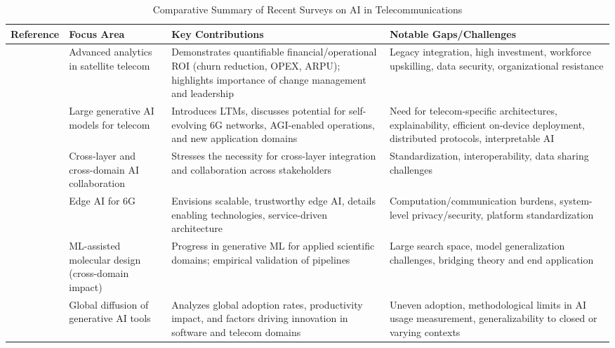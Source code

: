 \documentclass[sigconf]{acmart}
\begin{document}
\begin{table*}[htbp]
\centering
\caption{Comparative Summary of Recent Surveys on AI in Telecommunications}
\label{tab:survey_comparison}
\begin{adjustbox}{max width=\textwidth}
\begin{tabular}{@{}llll@{}}
\toprule
Reference & Focus Area & Key Contributions & Notable Gaps/Challenges \\
\midrule
\cite{ref19} & Advanced analytics in satellite telecom & Demonstrates quantifiable financial/operational ROI (churn reduction, OPEX, ARPU); highlights importance of change management and leadership & Legacy integration, high investment, workforce upskilling, data security, organizational resistance \\
\cite{ref26} & Large generative AI models for telecom & Introduces LTMs, discusses potential for self-evolving 6G networks, AGI-enabled operations, and new application domains & Need for telecom-specific architectures, explainability, efficient on-device deployment, distributed protocols, interpretable AI \\
\cite{ref29} & Cross-layer and cross-domain AI collaboration & Stresses the necessity for cross-layer integration and collaboration across stakeholders & Standardization, interoperability, data sharing challenges \\
\cite{ref49} & Edge AI for 6G & Envisions scalable, trustworthy edge AI, details enabling technologies, service-driven architecture & Computation/communication burdens, system-level privacy/security, platform standardization \\
\cite{ref6} & ML-assisted molecular design (cross-domain impact) & Progress in generative ML for applied scientific domains; empirical validation of pipelines & Large search space, model generalization challenges, bridging theory and end application \\
\cite{ref8} & Global diffusion of generative AI tools & Analyzes global adoption rates, productivity impact, and factors driving innovation in software and telecom domains & Uneven adoption, methodological limits in AI usage measurement, generalizability to closed or varying contexts \\
\bottomrule
\end{tabular}
\end{adjustbox}
\end{table*}
\end{document}
